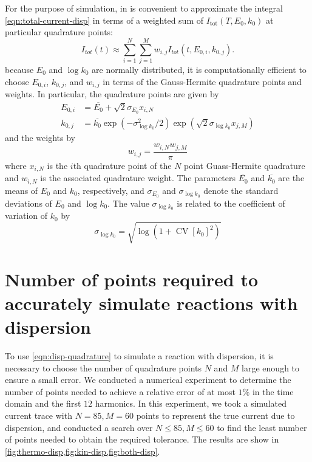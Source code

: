 \documentclass[twocolumn]{article}
\DeclareMathOperator{\CV}{CV}
\begin{document}
	For the purpose of simulation, in is convenient to approximate the integral \ref{eqn:total-current-disp} in terms of a weighted sum of $I_\mathrm{tot}(T, E_0, k_0)$ at particular quadrature points:
	\begin{equation}\label{eqn:disp-quadrature}
		I_{tot}(t) \approx \sum_{i=1}^N \sum_{j = 1}^M w_{i,j} I_{tot}(t, E_{0,i}, k_{0,j}).
	\end{equation}
	because $E_0$ and $\log k_0$ are normally distributed, it is computationally efficient to choose $E_{0,i}$, $k_{0,j}$, and $w_{i,j}$ in terms of the Gauss-Hermite quadrature points and weights.  In particular, the quadrature points are given by 
	\begin{equation}
		\begin{aligned}
			E_{0,i} &= \overline{E_0} + \sqrt{2} \sigma_{E_0} x_{i,N}\\
			k_{0,j} &= \overline{k_0} \exp(-\sigma_{\log k_0}^2 / 2) \exp\left(\sqrt{2} \sigma_{\log k_0} x_{j,M}\right)
		\end{aligned}
	\end{equation}
	and the weights by
	\begin{equation}
		w_{i,j} = \frac{w_{i,N}w_{j,M}}{\pi}
	\end{equation}
	where $x_{i,N}$ is the $i$th quadrature point of the $N$ point Guass-Hermite quadrature and $w_{i,N}$ is the associated quadrature weight.  The parameters $\overline{E_0}$ and $\overline{k_0}$ are the means of $E_0$ and $k_0$, respectively, and $\sigma_{E_0}$ and $\sigma_{\log k_0}$ denote the standard deviations of $E_0$ and $\log k_0$.  The value $\sigma_{\log k_0}$ is related to the coefficient of variation of $k_0$ by
	\begin{equation}
			\sigma_{\log k_0} = \sqrt{\log(1 + \CV[k_0] ^2)}
	\end{equation}
	
	\section{Number of points required to accurately simulate reactions with dispersion}
	
	To use \cref{eqn:disp-quadrature} to simulate a reaction with dispersion, it is necessary to choose the number of quadrature points $N$ and $M$ large enough to ensure a small error.  We conducted a numerical experiment to determine the number of points needed to achieve a relative error of at most $1\%$ in the time domain and the first $12$ harmonics.  In this experiment, we took a simulated current trace with $N = 85, M = 60$ points to represent the true current due to dispersion, and conducted a search over $N \le 85, M \le 60$ to find the least number of points needed to obtain the required tolerance.  The results are show in \cref{fig:thermo-disp,fig:kin-disp,fig:both-disp}.  
	
\end{document}
